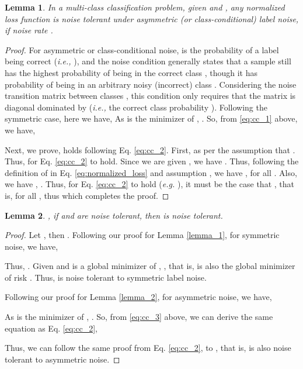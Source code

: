 \documentclass{article}
\newtheorem{lemma}{Lemma}
\begin{document}
\begin{lemma}
In a multi-class classification problem, given  and , any normalized loss function  is noise tolerant under asymmetric (or class-conditional) label noise, if noise rate .
\end{lemma}
\begin{proof}
For asymmetric or class-conditional noise,  is the probability of a label being correct (\textit{i.e.,} ), and the noise condition  generally states that a sample  still has the highest probability of being in the correct class , though it has probability of  being in an arbitrary noisy (incorrect) class .
Considering the noise transition matrix between classes , this condition only requires that the matrix is diagonal dominated by  (\textit{i.e.,} the correct class probability ). Following the symmetric case, here we have,
	\small{
		}
	As  is the minimizer of , . So, from \ref{eq:cc_1} above, we have,
	
	Next, we prove,  holds following Eq. \eqref{eq:cc_2}. First,  as per the assumption that . Thus,  for Eq. \eqref{eq:cc_2} to hold.
	Since we are given , we have . 
	Thus, following the definition of  in Eq. \eqref{eq:normalized_loss} and assumption , we have , for all . Also, we have , . Thus, for Eq. \eqref{eq:cc_2} to hold (\textit{e.g.} ), it must be the case that , that is,  for all , thus  which completes the proof.
\end{proof}

\begin{lemma}
, if  and  are noise tolerant, then  is noise tolerant.
\end{lemma}
\begin{proof}
Let , then
.
Following our proof for Lemma \ref{lemma_1}, for symmetric noise, we have,

Thus, .
Given  and  is a global minimizer of , , that is,  is also the global minimizer of risk . Thus,  is noise tolerant to symmetric label noise. 

Following our proof for Lemma \ref{lemma_2}, for asymmetric noise, we have,

\small{
		}
	
As  is the minimizer of , . So, from \ref{eq:cc_3} above, we can derive the same equation as Eq. \eqref{eq:cc_2},
	
 Thus, we can follow the same proof from Eq. \eqref{eq:cc_2}, to , that is,  is also noise tolerant to asymmetric noise.
\end{proof}
\end{document}
